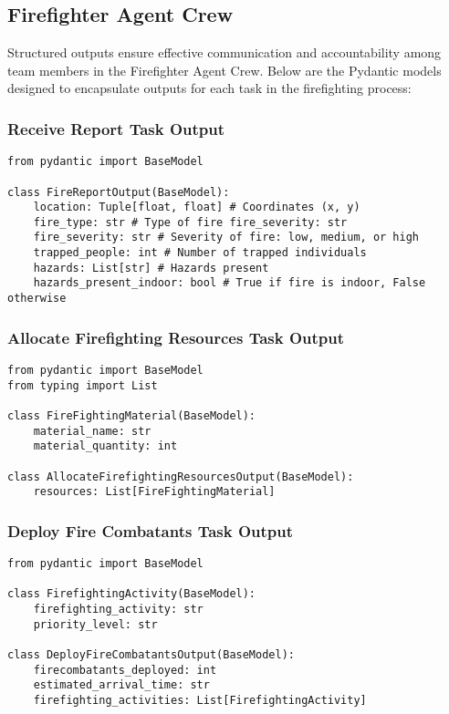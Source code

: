 \subsection{Firefighter Agent Crew}

Structured outputs ensure effective communication and accountability among team members in the Firefighter Agent Crew. Below are the Pydantic models designed to encapsulate outputs for each task in the firefighting process:

\subsubsection{Receive Report Task Output}
\begin{lstlisting}[caption={Pydantic model for Receive Report Task Output}]
from pydantic import BaseModel

class FireReportOutput(BaseModel):
    location: Tuple[float, float] # Coordinates (x, y)
    fire_type: str # Type of fire fire_severity: str
    fire_severity: str # Severity of fire: low, medium, or high
    trapped_people: int # Number of trapped individuals
    hazards: List[str] # Hazards present
    hazards_present_indoor: bool # True if fire is indoor, False otherwise
\end{lstlisting}


\subsubsection{Allocate Firefighting Resources Task Output}
\begin{lstlisting}[caption={Pydantic model for Allocate Firefighting Resources Task Output}]
from pydantic import BaseModel
from typing import List

class FireFightingMaterial(BaseModel):
    material_name: str
    material_quantity: int

class AllocateFirefightingResourcesOutput(BaseModel):
    resources: List[FireFightingMaterial]
\end{lstlisting}


\subsubsection{Deploy Fire Combatants Task Output}
\begin{lstlisting}[caption={Pydantic model for Deploy Fire Combatants Task Output}]
from pydantic import BaseModel

class FirefightingActivity(BaseModel):
    firefighting_activity: str
    priority_level: str

class DeployFireCombatantsOutput(BaseModel):
    firecombatants_deployed: int
    estimated_arrival_time: str
    firefighting_activities: List[FirefightingActivity]
\end{lstlisting}


